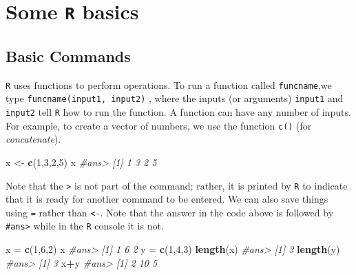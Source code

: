 \documentclass[]{book}
\newenvironment{Shaded}{\begin{snugshade}}{\end{snugshade}}
\newcommand{\KeywordTok}[1]{\textcolor[rgb]{0.13,0.29,0.53}{\textbf{#1}}}
\newcommand{\DecValTok}[1]{\textcolor[rgb]{0.00,0.00,0.81}{#1}}
\newcommand{\StringTok}[1]{\textcolor[rgb]{0.31,0.60,0.02}{#1}}
\newcommand{\CommentTok}[1]{\textcolor[rgb]{0.56,0.35,0.01}{\textit{#1}}}
\newcommand{\OperatorTok}[1]{\textcolor[rgb]{0.81,0.36,0.00}{\textbf{#1}}}
\newcommand{\NormalTok}[1]{#1}
\begin{document}
\section{\texorpdfstring{Some \texttt{R}
basics}{Some R basics}}\label{some-r-basics}

\subsection{Basic Commands}\label{basic-commands}

\texttt{R} uses functions to perform operations. To run a function
called \texttt{funcname},we type \texttt{funcname(input1,\ input2)} ,
where the inputs (or arguments) \texttt{input1} and \texttt{input2} tell
\texttt{R} how to run the function. A function can have any number of
inputs. For example, to create a vector of numbers, we use the function
\texttt{c()} (for \emph{concatenate}).

\begin{Shaded}
\begin{Highlighting}[]
\NormalTok{x <-}\StringTok{ }\KeywordTok{c}\NormalTok{(}\DecValTok{1}\NormalTok{,}\DecValTok{3}\NormalTok{,}\DecValTok{2}\NormalTok{,}\DecValTok{5}\NormalTok{)}
\NormalTok{x}
\CommentTok{#ans> [1] 1 3 2 5}
\end{Highlighting}
\end{Shaded}

Note that the \texttt{\textgreater{}} is not part of the command;
rather, it is printed by \texttt{R} to indicate that it is ready for
another command to be entered. We can also save things using \texttt{=}
rather than \texttt{\textless{}-}. Note that the answer in the code
above is followed by \texttt{\#ans\textgreater{}} while in the
\texttt{R} console it is not.

\begin{Shaded}
\begin{Highlighting}[]
\NormalTok{x =}\StringTok{ }\KeywordTok{c}\NormalTok{(}\DecValTok{1}\NormalTok{,}\DecValTok{6}\NormalTok{,}\DecValTok{2}\NormalTok{)}
\NormalTok{x}
\CommentTok{#ans> [1] 1 6 2}
\NormalTok{y =}\StringTok{ }\KeywordTok{c}\NormalTok{(}\DecValTok{1}\NormalTok{,}\DecValTok{4}\NormalTok{,}\DecValTok{3}\NormalTok{)}
\KeywordTok{length}\NormalTok{(x)}
\CommentTok{#ans> [1] 3}
\KeywordTok{length}\NormalTok{(y)}
\CommentTok{#ans> [1] 3}
\NormalTok{x}\OperatorTok{+}\NormalTok{y}
\CommentTok{#ans> [1]  2 10  5}
\end{Highlighting}
\end{Shaded}
\end{document}
